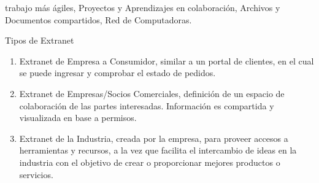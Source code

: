 \documentclass[a4paper,11pt]{article}
\begin{document}
trabajo más ágiles, Proyectos y Aprendizajes en colaboración, Archivos y Documentos 
compartidos, Red de Computadoras.\\ 
\begin{bf}  
Tipos de Extranet\\
\end{bf}
\begin{enumerate}    
\item Extranet de Empresa a Consumidor, similar a un portal de clientes, en el cual se 
puede ingresar y comprobar el estado de pedidos. 
\item Extranet de Empresas/Socios Comerciales, definición de un espacio de colaboración 
de las partes interesadas. Información es compartida y visualizada en base a 
permisos.
\item Extranet de la Industria, creada por la empresa, para proveer accesos a herramientas 
y recursos, a la vez que facilita el intercambio de ideas en la industria con el objetivo de crear o proporcionar mejores productos o servicios. 
\end{enumerate}
\end{document}
